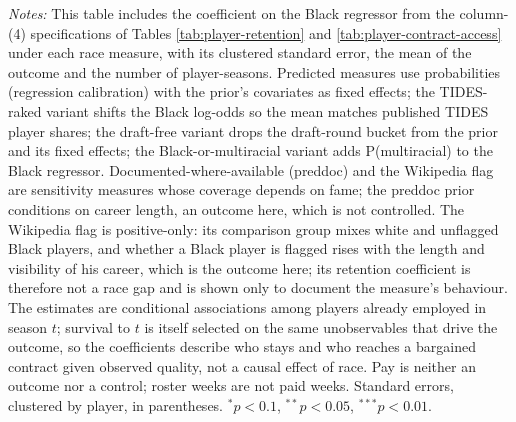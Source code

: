 {\footnotesize
\noindent\textit{Notes:} This table includes the coefficient on the Black regressor from the column-(4) specifications of Tables \ref{tab:player-retention} and \ref{tab:player-contract-access} under each race measure, with its clustered standard error, the mean of the outcome and the number of player-seasons. Predicted measures use probabilities (regression calibration) with the prior's covariates as fixed effects; the TIDES-raked variant shifts the Black log-odds so the mean matches published TIDES player shares; the draft-free variant drops the draft-round bucket from the prior and its fixed effects; the Black-or-multiracial variant adds P(multiracial) to the Black regressor. Documented-where-available (preddoc) and the Wikipedia flag are sensitivity measures whose coverage depends on fame; the preddoc prior conditions on career length, an outcome here, which is not controlled. The Wikipedia flag is positive-only: its comparison group mixes white and unflagged Black players, and whether a Black player is flagged rises with the length and visibility of his career, which is the outcome here; its retention coefficient is therefore not a race gap and is shown only to document the measure's behaviour. The estimates are conditional associations among players already employed in season $t$; survival to $t$ is itself selected on the same unobservables that drive the outcome, so the coefficients describe who stays and who reaches a bargained contract given observed quality, not a causal effect of race. Pay is neither an outcome nor a control; roster weeks are not paid weeks. Standard errors, clustered by player, in parentheses. $^{*}p<0.1$, $^{**}p<0.05$, $^{***}p<0.01$.
\par}

